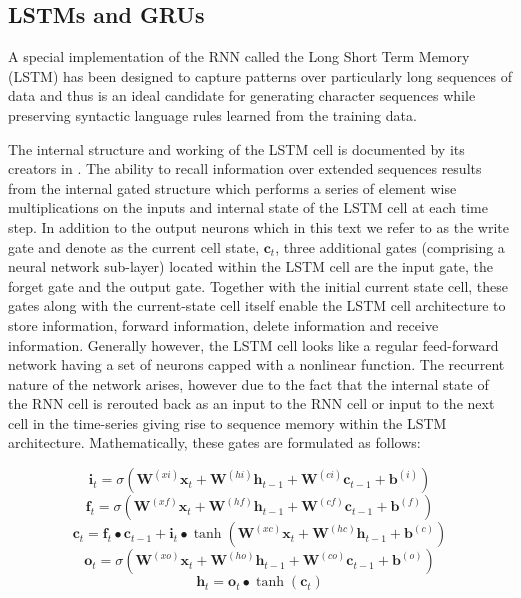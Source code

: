 \subsection{LSTMs and GRUs}

A special implementation of the RNN called the Long Short Term Memory (LSTM) has been designed to capture patterns over particularly long sequences of data and thus is an ideal candidate for generating character sequences while preserving syntactic language rules learned from the training data.

The internal structure and working  of the LSTM cell is documented by its creators in \cite{sak2014long}. The ability to recall information over extended sequences results from the internal gated structure which performs a series of element wise multiplications on the inputs and internal state of the LSTM cell at each time step.  In addition to the output neurons which in this text we refer to as the write gate and denote as the current cell state, $\mathbf{c}_t$, three additional gates (comprising a neural network sub-layer) located within the LSTM cell are the input gate, the forget gate and the output gate.  Together with the initial current state cell, these gates along with the current-state cell itself enable the LSTM cell architecture to store information, forward information, delete information and receive information.  Generally however, the LSTM cell looks like a regular feed-forward network having a set of neurons capped with a nonlinear function.  The recurrent nature of the network arises, however due to the fact that the internal state of the RNN cell is rerouted back as an input to the RNN cell or input to the next cell in the time-series giving rise to sequence memory within the LSTM architecture. Mathematically, these gates are formulated as follows:

\begin{equation}
\mathbf{i}_t=\sigma(\mathbf{W}^{(xi)}\mathbf{x}_t+\mathbf{W}^{(hi)}\mathbf{h}_{t-1}+\mathbf{W}^{(ci)}\mathbf{c}_{t-1}+\mathbf{b}^{(i)})
\label{eqn_c3_lstm01}
\end{equation}
\begin{equation}
\mathbf{f}_t=\sigma(\mathbf{W}^{(xf)}\mathbf{x}_t+\mathbf{W}^{(hf)}\mathbf{h}_{t-1}+\mathbf{W}^{(cf)}\mathbf{c}_{t-1}+\mathbf{b}^{(f)})
\label{eqn_c3_lstm02}
\end{equation}
\begin{equation}
\mathbf{c}_t=\mathbf{f}_t\bullet\mathbf{c}_{t- 1}+\mathbf{i}_t\bullet\tanh(\mathbf{W}^{(xc)}\mathbf{x}_t+\mathbf{W}^{(hc)}\mathbf{h}_{t-1}+\mathbf{b}^{(c)})\label{eqn_c3_lstm03}
\end{equation}
\begin{equation}
\mathbf{o}_t=\sigma(\mathbf{W}^{(xo)}\mathbf{x}_t+\mathbf{W}^{(ho)}\mathbf{h}_{t-1}+\mathbf{W}^{(co)}\mathbf{c}_{t-1}+\mathbf{b}^{(o)})\label{eqn_c3_lstm04}\end{equation}
\begin{equation}
\mathbf{h}_t=\mathbf{o}_t\bullet\tanh{(\mathbf{c}_t)}
\label{eqn_c3_lstm05}
\end{equation}

